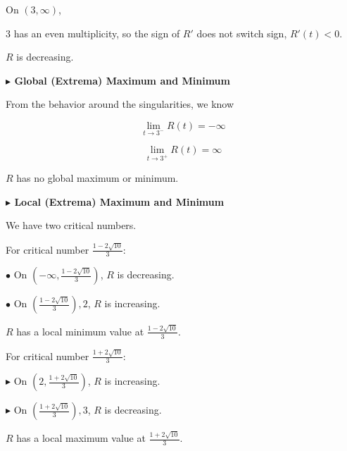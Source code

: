 \documentclass{ximera}
\begin{document}
On $(3, \infty)$, 


$3$ has an even multiplicity, so the sign of $R'$ does not switch sign, $R'(t) < 0$. 


$R$ is decreasing. 














\textbf{\textcolor{blue!55!black}{$\blacktriangleright$ Global (Extrema) Maximum and Minimum}} 




From the behavior around the singularities, we know


\[
\lim\limits_{t \to 3^-}R(t) = -\infty
\]



\[
\lim\limits_{t \to 3^+}R(t) = \infty
\]


$R$ has no global maximum or minimum.



















\textbf{\textcolor{blue!55!black}{$\blacktriangleright$ Local (Extrema) Maximum and Minimum}} 


We have two critical numbers.


For critical number $\frac{1 - 2 \sqrt{10}}{3}$: 


$\bullet$ On $\left( -\infty, \frac{1 - 2 \sqrt{10}}{3} \right)$, $R$ is decreasing. 


$\bullet$ On $\left( \frac{1 - 2 \sqrt{10}}{3} \right), 2$, $R$ is increasing. 


$R$ has a local minimum value at $\frac{1 - 2 \sqrt{10}}{3}$.  




For critical number $\frac{1 + 2 \sqrt{10}}{3}$: 


\textbf{$\blacktriangleright$} On $\left( 2, \frac{1 + 2 \sqrt{10}}{3} \right)$, $R$ is increasing. 



\textbf{$\blacktriangleright$} On $\left( \frac{1 + 2 \sqrt{10}}{3} \right), 3$, $R$ is decreasing. 


$R$ has a local maximum value at $\frac{1 + 2 \sqrt{10}}{3}$.  
\end{document}
